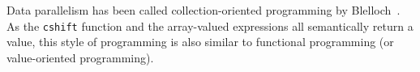 
%




Data parallelism has been called collection-oriented programming by
Blelloch~\cite{blelloch90}.  As the {\tt cshift}
function and the array-valued expressions all semantically return a
value, this style of programming is also similar to functional
programming (or value-oriented programming). 




